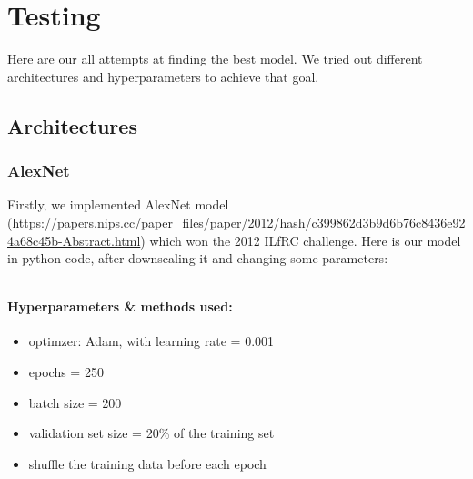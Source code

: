 \documentclass[12pt]{article}
\begin{document}
  \section{Testing}
    Here are our all attempts at finding the best model. We tried out different architectures and hyperparameters to achieve that goal.
    \subsection{Architectures}
      \subsubsection{AlexNet}
        Firstly, we implemented AlexNet model (\url{https://papers.nips.cc/paper_files/paper/2012/hash/c399862d3b9d6b76c8436e924a68c45b-Abstract.html})
        which won the 2012 ILfRC challenge. Here is our model in python code, after downscaling it and changing some parameters:
        \inputminted[linenos]{python}{code/alexnet.py}
        \paragraph{Hyperparameters \& methods used:}
          \begin{itemize}
            \item optimzer: Adam, with learning rate = 0.001
            \item epochs = 250
            \item batch size = 200
            \item validation set size = 20\% of the training set
            \item shuffle the training data before each epoch
          \end{itemize}
\end{document}

